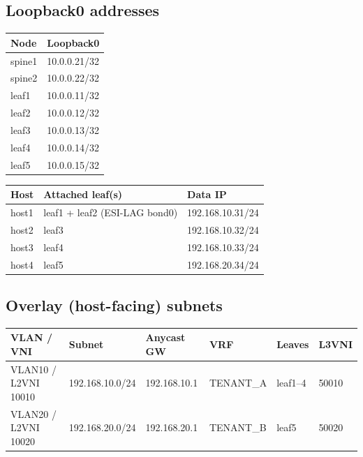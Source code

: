 \documentclass[11pt]{article}
\begin{document}
\newpage
\subsection*{Loopback0 addresses}

\begin{tabular}{ll}
\toprule
\textbf{Node} & \textbf{Loopback0} \\
\midrule
spine1 & 10.0.0.21/32 \\
spine2 & 10.0.0.22/32 \\
leaf1  & 10.0.0.11/32 \\
leaf2  & 10.0.0.12/32 \\
leaf3  & 10.0.0.13/32 \\
leaf4  & 10.0.0.14/32 \\
leaf5  & 10.0.0.15/32 \\
\bottomrule
\end{tabular}

\vspace{0.4cm}

\noindent
\begin{tabular}{lll}
\toprule
\textbf{Host} & \textbf{Attached leaf(s)} & \textbf{Data IP} \\
\midrule
host1 & leaf1 + leaf2 (ESI-LAG bond0) & 192.168.10.31/24 \\
host2 & leaf3                         & 192.168.10.32/24 \\
host3 & leaf4                         & 192.168.10.33/24 \\
host4 & leaf5                         & 192.168.20.34/24 \\
\bottomrule
\end{tabular}

\subsection*{Overlay (host-facing) subnets}

\begin{tabular}{llllll}
\toprule
\textbf{VLAN / VNI} & \textbf{Subnet} & \textbf{Anycast GW} & \textbf{VRF} & \textbf{Leaves} & \textbf{L3VNI} \\
\midrule
VLAN10 / L2VNI 10010 & 192.168.10.0/24 & 192.168.10.1 & TENANT\_A & leaf1--4 & 50010 \\
VLAN20 / L2VNI 10020 & 192.168.20.0/24 & 192.168.20.1 & TENANT\_B & leaf5    & 50020 \\
\bottomrule
\end{tabular}
\end{document}
